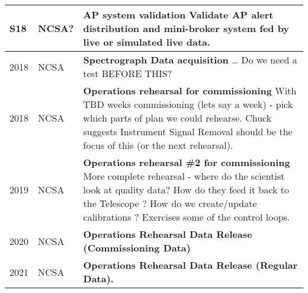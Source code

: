 \begin{longtable} {|l|l|p{}|}
S18 & NCSA? &  {\bf AP system validation}\newline
Validate AP alert distribution and mini-broker system fed by live or simulated live data. 
\\ \hline

2018 & NCSA & {\bf Spectrograph Data acquisition } \newline
\ldots  {\color{red} Do we need a test BEFORE THIS?}
\\ \hline

2018 &  NCSA & {\bf Operations rehearsal for commissioning }
With TBD weeks commissioning (lets say a week) - pick which parts of plan we could rehearse.
Chuck suggests Instrument Signal Removal should be the focus of this (or the next rehearsal).
\\ \hline

2019 & NCSA &  {\bf  Operations rehearsal \#2 for commissioning} 
More complete rehearsal - where do the scientist look at quality data? How do they feed it back to the Telescope ?
How do we create/update calibrations ? Exercises some of the control loops.
\\ \hline
\hline
2020 &  NCSA &  {\bf Operations  Rehearsal Data Release (Commissioning Data)}
\\ \hline
2021 &  NCSA &  {\bf Operations  Rehearsal Data Release (Regular Data).}
\\ \hline

\hline

\end{longtable}
